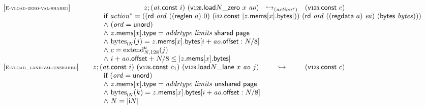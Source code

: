 $$\begin{array}[t]{@{}lrcl@{}l@{}}
{\begin{array}[t]{@{}l@{}}
\end{array}
} \\
{[\textsc{\scriptsize E{-}vload{-}zero{-}val{-}shared}]} \quad & z ; ({\mathit{at}}{.}\mathsf{const}~i)~({\mathsf{v{\scriptstyle 128}}{.}\mathsf{load}}{{N}{\mathsf{\_}}{\mathsf{zero}}}~x~{\mathit{ao}}) & {\hookrightarrow}_{({{\mathit{action}}^\ast})} {} & (\mathsf{v{\scriptstyle 128}}{.}\mathsf{const}~c) &  \\
& \multicolumn{4}{@{}l@{}}{\quad
\quad
\begin{array}[t]{@{}l@{}}
\mbox{if}~ {{\mathit{action}}^\ast} = ((\mathsf{rd}~{\mathit{ord}}~((\mathsf{reglen}~a)~0)~(\mathsf{i{\scriptstyle 32}}{.}\mathsf{const}~{|z{.}\mathsf{mems}{}[x]{.}\mathsf{bytes}|}))~(\mathsf{rd}~{\mathit{ord}}~((\mathsf{regdata}~a)~{\mathit{ea}})~(\mathsf{bytes}~{\mathit{bytes}}))) \\
{\land}~ ({\mathit{ord}} = \mathsf{unord}) \\
{\land}~ z{.}\mathsf{mems}{}[x]{.}\mathsf{type} = {\mathit{addrtype}}~{\mathit{limits}}~\mathsf{shared}~\mathsf{page} \\
{\land}~ {{\mathrm{bytes}}}_{{\mathsf{i}}{N}}(j) = z{.}\mathsf{mems}{}[x]{.}\mathsf{bytes}{}[i + {\mathit{ao}}{.}\mathsf{offset} : N / 8] \\
{\land}~ c = {{{{\mathrm{extend}}}_{N, 128}^{\mathsf{u}}}}{(j)} \\
{\land}~ i + {\mathit{ao}}{.}\mathsf{offset} + N / 8 \leq {|z{.}\mathsf{mems}{}[x]{.}\mathsf{bytes}|} \\
\end{array}
} \\
{[\textsc{\scriptsize E{-}vload\_lane{-}val{-}unshared}]} \quad & z ; ({\mathit{at}}{.}\mathsf{const}~i)~(\mathsf{v{\scriptstyle 128}}{.}\mathsf{const}~c_1)~({\mathsf{v{\scriptstyle 128}}{.}\mathsf{load}}{N}{\mathsf{\_}}{\mathsf{lane}}~x~{\mathit{ao}}~j) & \hookrightarrow & (\mathsf{v{\scriptstyle 128}}{.}\mathsf{const}~c) &  \\
& \multicolumn{4}{@{}l@{}}{\quad
\quad
\begin{array}[t]{@{}l@{}}
\mbox{if}~ ({\mathit{ord}} = \mathsf{unord}) \\
{\land}~ z{.}\mathsf{mems}{}[x]{.}\mathsf{type} = {\mathit{addrtype}}~{\mathit{limits}}~\mathsf{unshared}~\mathsf{page} \\
{\land}~ {{\mathrm{bytes}}}_{{\mathsf{i}}{N}}(k) = z{.}\mathsf{mems}{}[x]{.}\mathsf{bytes}{}[i + {\mathit{ao}}{.}\mathsf{offset} : N / 8] \\
{\land}~ N = {|{\mathsf{i}}{N}|} \\

\end{array}}
\end{array}$$
